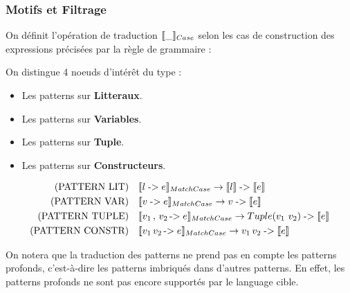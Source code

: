\documentclass[12pt]{article}
\begin{document}
\subsubsection*{Motifs et Filtrage}\label{motifs-et-filtrage}

On définit l'opération de traduction \(\llbracket \_ \rrbracket_{Case}\) selon les cas de construction
des expressions précisées par la règle de grammaire : 

On distingue 4 noeuds d'intérêt du type :
\begin{itemize}
      \tightlist
      \item
            Les patterns sur \textbf{Litteraux}.
      \item
            Les patterns sur \textbf{Variables}.
      \item
            Les patterns sur \textbf{Tuple}.
      \item
            Les patterns sur \textbf{Constructeurs}.
\end{itemize}

\begin{align*}
      \text{(PATTERN LIT)} \quad    & \llbracket l \; \text{->} \; e \rrbracket_{MatchCase} \rightarrow \llbracket l \rrbracket \; \text{->} \; \llbracket e \rrbracket                \\
      \text{(PATTERN VAR)} \quad    & \llbracket v \; \text{->} \; e \rrbracket_{MatchCase} \rightarrow v \; \text{->} \; \llbracket e \rrbracket                                  \\
      \text{(PATTERN TUPLE)} \quad  & \llbracket v_1 \, , \, v_2 \, \text{->} \; e \rrbracket_{MatchCase} \rightarrow Tuple(v_1 \, \, v_2) \; \text{->} \; \llbracket e \rrbracket \\
      \text{(PATTERN CONSTR)} \quad & \llbracket v_1 \, v_2 \, \text{->} \; e \rrbracket_{MatchCase} \rightarrow v_1 \, v_2 \; \text{->} \; \llbracket e \rrbracket                \\
\end{align*}

On notera que la traduction des patterns ne prend pas en compte les patterns profonds, c'est-à-dire les patterns imbriqués dans d'autres patterns.
En effet, les patterns profonds ne sont pas encore supportés par le language cible.
\end{document}
